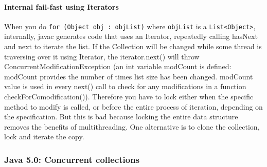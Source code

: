 \documentclass{article}
\begin{document}
\paragraph{Internal fail-fast using Iterators} When you do \lstinline{for (Object obj : objList)} where \lstinline{objList} is a \lstinline{List<Object>}, internally, javac generates code that uses an Iterator, repeatedly calling hasNext and next to iterate the list. If the Collection will be changed while some thread is traversing over it using Iterator, the iterator.next() will throw ConcurrentModificationException (an int variable modCount is defined: modCount provides the number of times list size has been changed. modCount value is used in every next() call to check for any modifications in a function checkForComodification()). Therefore you have to lock either when the specific method to modify is called, or before the entire process of iteration, depending on the specification. But this is bad because locking the entire data structure removes the benefits of multithreading. One alternative is to clone the collection, lock and iterate the copy.

\subsubsection{Java 5.0: Concurrent collections}
\end{document}
